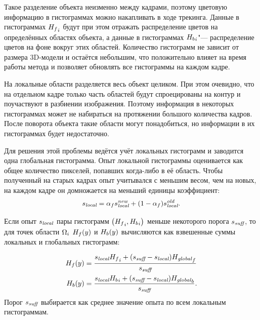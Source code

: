 Такое разделение объекта неизменно между кадрами, поэтому цветовую информацию
в гистограммах можно накапливать в ходе трекинга.
Данные в гистограммах ${H_f}_i$ будут при этом отражать распределение
цветов на определённых областях объекта, а данные в гистограммах
${H_b}_i$"--- распределение цветов на фоне вокруг этих областей.
Количество гистограмм не зависит от размера 3D-модели и остаётся небольшим, что
положительно влияет на время работы метода и позволяет обновлять все
гистограммы на каждом кадре.

На локальные области разделяется весь объект целиком.
При этом очевидно, что на отдельном кадре только часть областей будут
спроецированы на контур и поучаствуют в разбиении изображения.
Поэтому информация в некоторых гистограммах может не набираться на протяжении
большого количества кадров.
После поворота объекта такие области могут понадобиться, но информации в
их гистограммах будет недостаточно.

Для решения этой проблемы ведётся учёт  локальных гистограмм и
заводится одна глобальная гистограмма.
Опыт локальной гистограммы оценивается как общее количество пикселей, попавших
когда-либо в её область.
Чтобы полученный на старых кадрах опыт учитывался с меньшим весом, чем на
новых, на каждом кадре он домножается на меньший единицы коэффициент:
\begin{equation}
    s_{\text{\it local}} = \alpha_f s_{\text{\it local}}^{\text{\it new}} + (1 -
    \alpha_f) s_{\text{\it local}}^{\text{\it old}}
    \text{.}
\end{equation}

Если опыт $s_{\text{\it local}}$ пары гистограмм $\left( {H_f}_i,
{H_b}_i \right)$ меньше некоторого порога
$s_{\text{\it suff}}$, то для точек области $\Omega_i$ $H_f(y)$ и $H_b(y)$
вычисляются как взвешенные суммы локальных и глобальных гистограмм:

\begin{align}
\label{eqn:histo_skill}
H_f(y) &= \dfrac{s_{\text{\it local}} {H_f}_i + (s_{\text{\it suff}} -
s_{\text{\it local}})
        {H_{\text {\it global}}}_f}{s_{\text{\it suff}}} \\
H_b(y) &= \dfrac{s_{\text{\it local}} {H_b}_i + (s_{\text{\it suff}} -
s_{\text{\it local}})
        {H_{\text {\it global}}}_b}{s_{\text{\it suff}}}
\text{.}
\end{align}
Порог $s_{\text{\it suff}}$ выбирается как среднее значение опыта по всем
локальным гистограммам.


